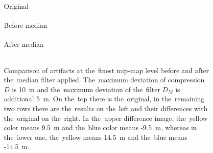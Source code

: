 \begin{figure}
	\begin{center}
		Original \\ 
		 \\ 
		Before median \\ 
		 
		 \\ 
		After median \\ 
		 
		 \\ 
	\end{center}
	\caption{Comparison of artifacts at the~finest mip-map level before and after the~median filter applied. The~maximum deviation of compression $D$ is 10~m and the~maximum deviation of the~filter $D_M$ is additional 5~m. On the~top there is the~original, in the~remaining two rows there are the~results on the~left and their differences with the~original on the~right. In the~upper difference image, the~yellow color means 9.5~m and the~blue color means -9.5~m, whereas in the~lower one, the~yellow means 14.5~m and the~blue means -14.5~m.}
	\label{fig:artifs_median}
\end{figure}
